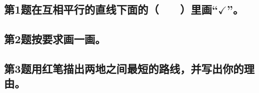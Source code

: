 \subsection*{第1题\quad 在互相平行的直线下面的（　　）里画“\(\checkmark\)”。}
\subsection*{第2题\quad 按要求画一画。}
\subsection*{第3题\quad 用红笔描出两地之间最短的路线，并写出你的理由。}
